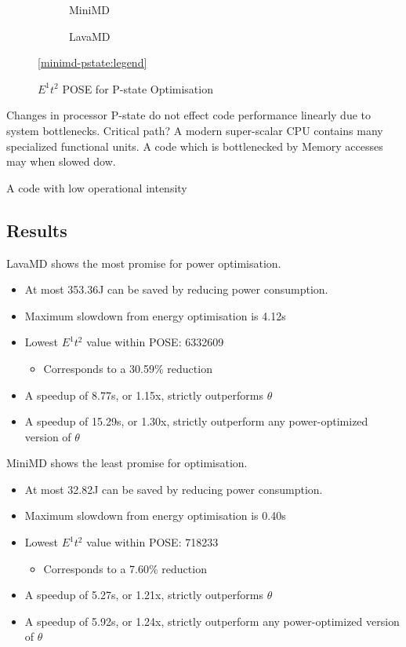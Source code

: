 \begin{figure}[t]%
\begin{subfigure}[t]{.5\linewidth}%
\centering%
%
\caption{MiniMD}%
\end{subfigure}%
\begin{subfigure}[t]{.5\linewidth}%
%
\caption{LavaMD}%
\end{subfigure}%
\begin{center}%
\ref{minimd-pstate:legend}%
\end{center}%
\caption{$E^1t^2$ POSE for P-state Optimisation}%
\label{fig:pstates}%
\end{figure}%

Changes in processor P-state do not effect code performance linearly due to system bottlenecks. Critical path?  A modern super-scalar CPU contains many specialized functional units. A code which is bottlenecked by Memory accesses may when slowed dow.

A code with low operational intensity

\subsection{Results}


LavaMD shows the most promise for power optimisation.
\begin{itemize}
  \item At most 353.36J can be saved by reducing power consumption.
  \item Maximum slowdown from energy optimisation is 4.12s
  \item Lowest $E^1t^2$ value within POSE:  6332609
  \begin{itemize}
  \item Corresponds to a 30.59\% reduction
  \end{itemize}
  
  \item A speedup of 8.77s, or 1.15x, strictly outperforms $\theta$
  \item A speedup of 15.29s, or 1.30x, strictly outperform any power-optimized version of $\theta$
\end{itemize}

MiniMD shows the least promise for optimisation.
\begin{itemize}
  \item At most 32.82J can be saved by reducing power consumption.
  \item Maximum slowdown from energy optimisation is 0.40s
  \item Lowest $E^1t^2$ value within POSE:  718233
  \begin{itemize}
  \item Corresponds to a 7.60\% reduction
  \end{itemize}
  \item A speedup of 5.27s, or 1.21x, strictly outperforms $\theta$
  \item A speedup of 5.92s, or 1.24x, strictly outperform any power-optimized version of $\theta$
\end{itemize}




